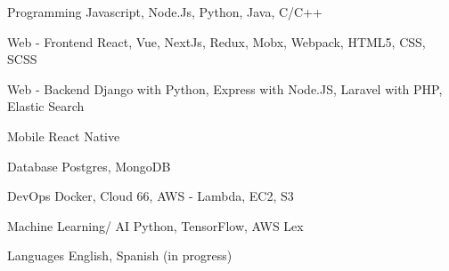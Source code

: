 


\begin{cvskills}


\cvskill
{Programming} %
{Javascript, Node.Js, Python, Java, C/C++} %


\cvskill
{Web - Frontend} %
{React, Vue, NextJs, Redux, Mobx, Webpack, HTML5, CSS, SCSS} %


\cvskill
{Web - Backend} %
{Django with Python, Express with Node.JS, Laravel with PHP, Elastic Search} %


\cvskill
{Mobile} %
{React Native} %


\cvskill
{Database} %
{Postgres, MongoDB} %


\cvskill
{DevOps} %
{Docker, Cloud 66, AWS - Lambda, EC2, S3} %


\cvskill
{Machine Learning/ AI} %
{Python, TensorFlow, AWS Lex} %


\cvskill
{Languages} %
{English, Spanish (in progress)} %


\end{cvskills}